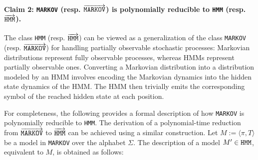 \begin{comment}
    Corollary:
      *-*-SHAP(M,NB) < *-*SHAP(M,NB)
     From Van den Broeck: 
      LOC-C-SHAP(SIGMOID,HMM) Hard
\end{comment}

\paragraph{Claim 2: \texttt{MARKOV} (resp. $\overrightarrow{\texttt{\text{MARKOV}}}$) is polynomially reducible to \texttt{HMM} (resp. $\overrightarrow{\texttt{\text{HMM}}}$).} The class \texttt{HMM} (resp. $\overrightarrow{\texttt{\text{HMM}}}$) can be viewed as a generalization of the class \texttt{MARKOV} (resp. $\overrightarrow{\texttt{\text{MARKOV}}}$) for handling partially observable stochastic processes: Markovian distributions represent fully observable processes, whereas HMMs represent partially observable ones. Converting a Markovian distribution into a distribution modeled by an HMM involves encoding the Markovian dynamics into the hidden state dynamics of the HMM. The HMM then trivially emits the corresponding symbol of the reached hidden state at each position.


For completeness, the following provides a formal description of how \texttt{MARKOV} is polynomially reducible to \texttt{HMM}. The derivation of a polynomial-time reduction from $\overrightarrow{\texttt{\text{MARKOV}}}$ to $\overrightarrow{\texttt{\text{HMM}}}$ can be achieved using a similar construction. Let $M := \langle \pi, T\rangle $ be a model in \texttt{MARKOV} over the alphabet $\Sigma$. The description of a model $M' \in \texttt{\text{HMM}}$, equivalent to $M$, is obtained as follows:


